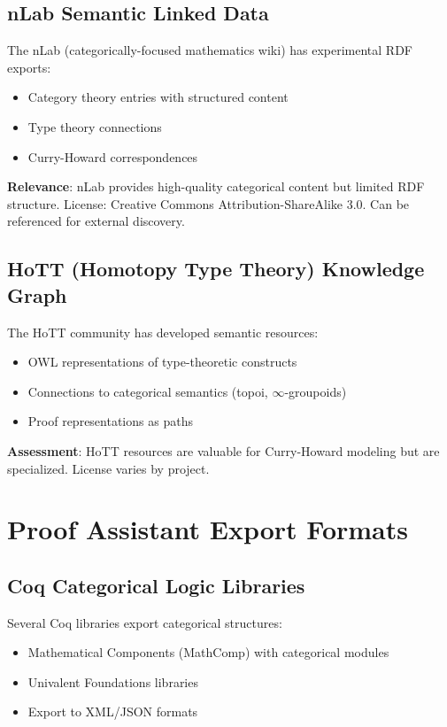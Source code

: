 \subsection{nLab Semantic Linked Data}

The nLab (categorically-focused mathematics wiki) has experimental RDF exports:
\begin{itemize}
  \item Category theory entries with structured content
  \item Type theory connections
  \item Curry-Howard correspondences
\end{itemize}

\textbf{Relevance}: nLab provides high-quality categorical content but limited RDF structure. License: Creative Commons Attribution-ShareAlike 3.0. Can be referenced for external discovery.

\subsection{HoTT (Homotopy Type Theory) Knowledge Graph}

The HoTT community has developed semantic resources:
\begin{itemize}
  \item OWL representations of type-theoretic constructs
  \item Connections to categorical semantics (topoi, $\infty$-groupoids)
  \item Proof representations as paths
\end{itemize}

\textbf{Assessment}: HoTT resources are valuable for Curry-Howard modeling but are specialized. License varies by project.

\section{Proof Assistant Export Formats}

\subsection{Coq Categorical Logic Libraries}

Several Coq libraries export categorical structures:
\begin{itemize}
  \item Mathematical Components (MathComp) with categorical modules
  \item Univalent Foundations libraries
  \item Export to XML/JSON formats
\end{itemize}

